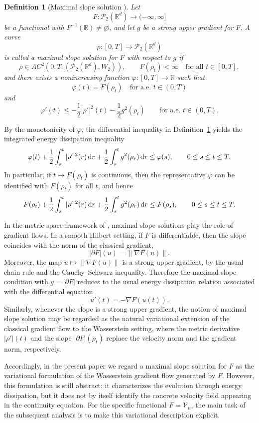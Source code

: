 \documentclass[11pt,reqno]{amsart}
\numberwithin{figure}{section}
\def\d {{\partial}}
\def\d{\mathrm{d}}
\renewcommand{\d}{  {\textup{d}} }
\newtheorem{definition}{Definition}[section]
\begin{document}
\begin{definition}[Maximal slope solution {\cite[Definition~1.3.2]{AGS2005}}]
	\label{def:maximal-slope}
	Let
	\[
	F:\mathcal P_2(\mathbb R^d)\to(-\infty,\infty]
	\]
	be a functional with $F^{-1}(\mathbb{R})\neq \varnothing$, and let $g$ be a strong upper gradient for $F$. A curve
	\[
	\rho:[0,T]\to\mathcal P_2(\mathbb R^d)
	\]
	is called a maximal slope solution for $F$ with respect to $g$ if
	\[
	\rho\in AC^2(0,T;(\mathcal P_2(\mathbb R^d),W_2)),
	\qquad
	F(\rho_t)<\infty \quad \text{for all } t\in[0,T],
	\]
	and there exists a nonincreasing function $\varphi:[0,T]\to\mathbb R$ such that
	\[
	\varphi(t)=F(\rho_t)\quad\text{for a.e.\ }t\in(0,T)
	\]
	and
	\[
	\varphi'(t)\le -\frac12|\rho'|^2(t)-\frac12 g^2(\rho_t)
	\qquad\text{for a.e.\ }t\in(0,T).
	\]
\end{definition}

By the monotonicity of $\varphi$, the differential inequality in Definition~\ref{def:maximal-slope} yields the integrated energy dissipation inequality 
\[ \varphi(t) + \frac12\int_s^t |\rho'|^2(r)\,\d r + \frac12\int_s^t g^2(\rho_r)\,\d r \le \varphi(s), \qquad 0\le s\le t\le T. \] 
 In particular, if $t\mapsto F(\rho_t)$ is continuous, then the representative $\varphi$ can be identified with $F(\rho_t)$ for all $t$, and hence 
\[ F(\rho_t) + \frac12\int_s^t |\rho'|^2(r)\,\d r + \frac12\int_s^t g^2(\rho_r)\,\d r \le F(\rho_s), \qquad 0\le s\le t\le T. \]


In the metric-space framework of \cite{AGS2005}, maximal slope solutions play the role of gradient flows. In a smooth Hilbert setting, if $F$ is differentiable, then the slope coincides with the norm of the classical gradient, 
\[ |\partial F|(u)=\|\nabla F(u)\|. \] 
Moreover, the map $u\mapsto\|\nabla F(u)\|$ is a strong upper gradient, by the usual chain rule and the Cauchy--Schwarz inequality. Therefore the maximal slope condition with $g=|\partial F|$ reduces to the usual energy dissipation relation associated with the differential equation 
\[ u'(t)=-\nabla F(u(t)). \] 
Similarly, whenever the  slope is a strong upper gradient, the notion of maximal slope solution may be regarded as the natural variational extension of the classical gradient flow to the Wasserstein setting, where the metric derivative $|\rho'|(t)$ and the slope $|\partial F|(\rho_t)$ replace the velocity norm and the gradient norm, respectively.

Accordingly, in the present paper we regard a maximal slope solution for $F$ as the variational formulation of the Wasserstein gradient flow generated by $F$. However, this formulation is still abstract: it characterizes the evolution through energy dissipation, but it does not by itself identify the concrete velocity field appearing in the continuity equation. For the specific functional $F=\mathcal V_n$, the main task of the subsequent analysis is to make this variational description explicit.
\end{document}
